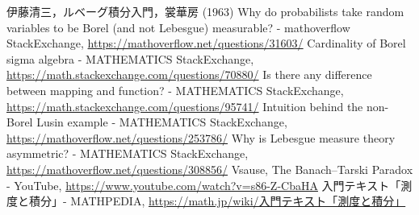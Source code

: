 \begin{thebibliography}{99}
	 伊藤清三，ルベーグ積分入門，裳華房 (1963)
	 Why do probabilists take random variables to be Borel (and not Lebesgue) measurable? - mathoverflow StackExchange,
		\url{https://mathoverflow.net/questions/31603/}
	 Cardinality of Borel sigma algebra - MATHEMATICS StackExchange,\\
		\url{https://math.stackexchange.com/questions/70880/}
	 Is there any difference between mapping and function? - MATHEMATICS StackExchange,\\
		\url{https://math.stackexchange.com/questions/95741/}
	 Intuition behind the non-Borel Lusin example - MATHEMATICS StackExchange,\\
		\url{https://mathoverflow.net/questions/253786/}
	 Why is Lebesgue measure theory asymmetric? - MATHEMATICS StackExchange,\\
		\url{https://mathoverflow.net/questions/308856/}
	 Vsause, The Banach–Tarski Paradox - YouTube,
		\url{https://www.youtube.com/watch?v=s86-Z-CbaHA}
	 入門テキスト「測度と積分」- MATHPEDIA,
		\href{https://math.jp/wiki/%E5%85%A5%E9%96%80%E3%83%86%E3%82%AD%E3%82%B9%E3%83%88%E3%80%8C%E6%B8%AC%E5%BA%A6%E3%81%A8%E7%A9%8D%E5%88%86%E3%80%8D}{https://math.jp/wiki/入門テキスト「測度と積分」}
\end{thebibliography}

